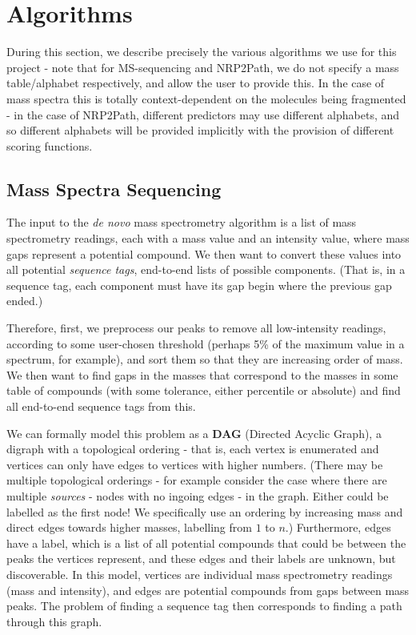 \documentclass{l4proj}
\newcommand{\cit}[1]{\citep{#1}}
\begin{document}
\section{Algorithms}

During this section, we describe precisely the various algorithms we use for this project - note that for MS-sequencing and NRP2Path, we do not specify a mass table/alphabet respectively, and allow the user to provide this. In the case of mass spectra this is totally context-dependent on the molecules being fragmented - in the case of NRP2Path, different predictors may use different alphabets, and so different alphabets will be provided implicitly with the provision of different scoring functions.

\subsection{Mass Spectra Sequencing} \label{msalgorithm}

The input to the \textit{de novo} mass spectrometry algorithm is a list of mass spectrometry readings, each with a mass value and an intensity value, where mass gaps represent a potential compound. We then want to convert these values into all potential \textit{sequence tags}, end-to-end lists of possible components. (That is, in a sequence tag, each component must have its gap begin where the previous gap ended.) 

Therefore, first, we preprocess our peaks to remove all low-intensity readings, according to some user-chosen threshold (perhaps 5\% of the maximum value in a spectrum, for example), and sort them so that they are increasing order of mass. We then want to find gaps in the masses that correspond to the masses in some table of compounds (with some tolerance, either percentile or absolute) and find all end-to-end sequence tags from this.

We can formally model this problem as a \textbf{DAG} (Directed Acyclic Graph), a digraph with a topological ordering - that is, each vertex is enumerated and vertices can only have edges to vertices with higher numbers.  (There may be multiple topological orderings - for example consider the case where there are multiple \textit{sources} - nodes with no ingoing edges - in the graph. Either could be labelled as the first node! We specifically use an ordering by increasing mass and direct edges towards higher masses, labelling from \(1\) to \(n\).) Furthermore, edges have a label, which is a list of all potential compounds that could be between the peaks the vertices represent, and these edges and their labels are unknown, but discoverable. In this model, vertices are individual mass spectrometry readings (mass and intensity), and edges are potential compounds from gaps between mass peaks. The problem of finding a sequence tag then corresponds to finding a path through this graph. \cit{msbook}
\end{document}
